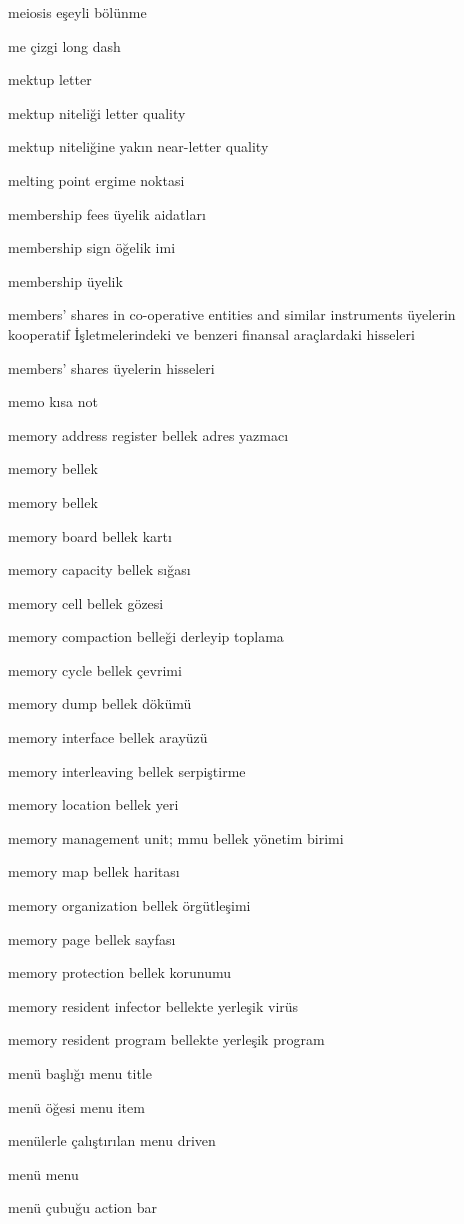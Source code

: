 \documentclass[12pt,fleqn]{article}\usepackage{../../common}
\begin{document}
meiosis eşeyli bölünme

me çizgi long dash

mektup letter

mektup niteliği letter quality

mektup niteliğine yakın near-letter quality

melting point ergime noktasi

membership fees üyelik aidatları

membership sign öğelik imi

membership üyelik

members' shares in co-operative entities and similar instruments üyelerin kooperatif İşletmelerindeki ve benzeri finansal araçlardaki hisseleri

members' shares üyelerin hisseleri

memo kısa not

memory address register bellek adres yazmacı

memory bellek

memory bellek

memory board bellek kartı

memory capacity bellek sığası

memory cell bellek gözesi

memory compaction belleği derleyip toplama

memory cycle bellek çevrimi

memory dump bellek dökümü

memory interface bellek arayüzü

memory interleaving bellek serpiştirme

memory location bellek yeri

memory management unit; mmu bellek yönetim birimi

memory map bellek haritası

memory organization bellek örgütleşimi

memory page bellek sayfası

memory protection bellek korunumu

memory resident infector bellekte yerleşik virüs

memory resident program bellekte yerleşik program

menü başlığı menu title

menü öğesi menu item

menülerle çalıştırılan menu driven

menü menu

menü çubuğu action bar
\end{document}
